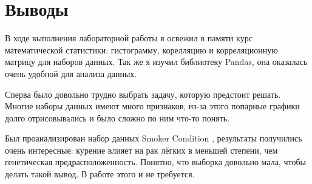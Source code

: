 \section{Выводы}
В ходе выполнения лабораторной работы я освежил в памяти курс математической статистики: гистограмму, корелляцию и корреляционную матрицу для наборов данных. Так же я изучил библиотеку Pandas, она оказалась очень удобной для анализа данных.

Сперва было довольно трудно выбрать задачу, которую предстоит решать. Многие наборы данных имеют много признаков, из-за этого попарные графики долго отрисовывались и было сложно по ним что-то понять.

Был проанализирован набор данных Smoker Condition \cite{kaggle}, результаты получились очень интересные: курение влияет на рак лёгких в меньшей степени, чем генетическая предрасположенность. Понятно, что выборка довольно мала, чтобы делать такой вывод. В работе этого и не требуется.
\pagebreak
